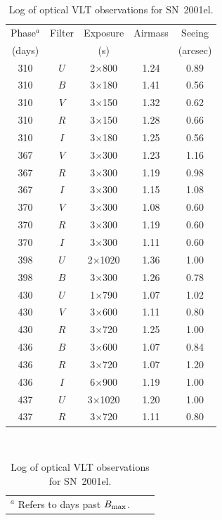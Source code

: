 \documentclass{aa}
\begin{document}
\clearpage 
\setcounter{table}{0}
\begin{table}
\caption{Log of optical VLT observations for SN~2001el.}
\label{table:1}
\centering
\begin{tabular}{ccccc}
\hline\hline
Phase$^{a}$ & Filter & Exposure & Airmass & Seeing  \\
(days)      &        & (s)      &         & (arcsec) \\
\hline
310        & $U$  & 2$\times$800 & 1.24 & 0.89 \\
310        & $B$  & 3$\times$180 & 1.41 & 0.56  \\
310        & $V$  & 3$\times$150 & 1.32 & 0.62  \\
310        & $R$  & 3$\times$150 & 1.28 & 0.66  \\
310        & $I$  & 3$\times$180 & 1.25 & 0.56  \\
367        & $V$  & 3$\times$300 & 1.23 & 1.16  \\
367        & $R$  & 3$\times$300 & 1.19 & 0.98  \\
367        & $I$  & 3$\times$300 & 1.15 & 1.08  \\
370        & $V$  & 3$\times$300 & 1.08 & 0.60  \\
370        & $R$  & 3$\times$300 & 1.19 & 0.60  \\
370        & $I$  & 3$\times$300 & 1.11 & 0.60  \\
398        & $U$  &2$\times$1020 & 1.36 & 1.00 \\
398        & $B$  & 3$\times$300 & 1.26 & 0.78 \\
430        & $U$  & 1$\times$790 & 1.07 & 1.02 \\ %
430        & $V$  & 3$\times$600 & 1.11 & 0.80 \\
430        & $R$  & 3$\times$720 & 1.25 & 1.00 \\
436        & $B$  & 3$\times$600 & 1.07 & 0.84 \\
436        & $R$  & 3$\times$720 & 1.07 & 1.20 \\
436        & $I$  & 6$\times$900 & 1.19 & 1.00 \\
437        & $U$  &3$\times$1020 & 1.20 & 1.00\\ %
437        & $R$  & 3$\times$720 & 1.11 & 0.80 \\
\hline
\end{tabular} \\
\begin{tabular}{lll}
$^a$ Refers to days past $B_{\rm max}$. && \\
\end{tabular}
\end{table}
\end{document}
